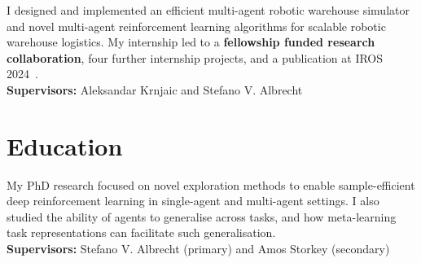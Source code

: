 \documentclass[a4paper,12pt]{article}
\begin{document}
\begin{expblock}
    I designed and implemented an efficient multi-agent robotic warehouse simulator and novel multi-agent reinforcement learning algorithms for scalable robotic warehouse logistics. My internship led to a \textbf{fellowship funded research collaboration}, four further internship projects, and a publication at IROS 2024~\cite{krnjaic2024scalable}.\\
    \textbf{Supervisors:} Aleksandar Krnjaic and Stefano V. Albrecht
\end{expblock}

\section{Education}

\begin{expblock}
    My PhD research focused on novel exploration methods to enable sample-efficient deep reinforcement learning in single-agent and multi-agent settings. I also studied the ability of agents to generalise across tasks, and how meta-learning task representations can facilitate such generalisation.\\
    \textbf{Supervisors:} Stefano V. Albrecht (primary) and Amos Storkey (secondary)
\end{expblock}
\end{document}
